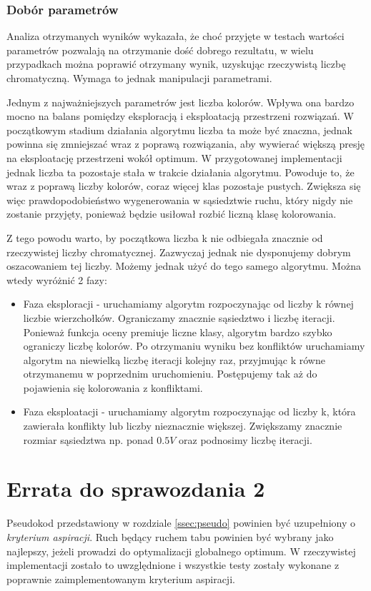 \documentclass[12pt,a4paper]{article}
\begin{document}
\subsubsection{Dobór parametrów}
Analiza otrzymanych wyników wykazała, że choć przyjęte w testach wartości parametrów pozwalają na otrzymanie dość dobrego rezultatu, w wielu przypadkach można poprawić otrzymany wynik, uzyskując rzeczywistą liczbę chromatyczną. Wymaga to jednak manipulacji parametrami.

Jednym z najważniejszych parametrów jest liczba kolorów. Wpływa ona bardzo mocno na balans pomiędzy eksploracją i eksploatacją przestrzeni rozwiązań. W początkowym stadium działania algorytmu liczba ta może być znaczna, jednak powinna się zmniejszać wraz z poprawą rozwiązania, aby wywierać większą presję na eksploatację przestrzeni wokół optimum. W przygotowanej implementacji jednak liczba ta pozostaje stała w trakcie działania algorytmu. Powoduje to, że wraz z poprawą liczby kolorów, coraz więcej klas pozostaje pustych. Zwiększa się więc prawdopodobieństwo wygenerowania w sąsiedztwie ruchu, który nigdy nie zostanie przyjęty, ponieważ będzie usiłował rozbić liczną klasę kolorowania.

Z tego powodu warto, by początkowa liczba k nie odbiegała znacznie od rzeczywistej liczby chromatycznej. Zazwyczaj jednak nie dysponujemy dobrym oszacowaniem tej liczby. Możemy jednak użyć do tego samego algorytmu. Można wtedy wyróżnić 2 fazy: 
\begin{itemize}
\item Faza eksploracji - uruchamiamy algorytm rozpoczynając od liczby k równej liczbie wierzchołków. Ograniczamy znacznie sąsiedztwo i liczbę iteracji. Ponieważ funkcja oceny premiuje liczne klasy, algorytm bardzo szybko ograniczy liczbę kolorów. Po otrzymaniu wyniku bez konfliktów uruchamiamy algorytm na niewielką liczbę iteracji kolejny raz, przyjmując k równe otrzymanemu w poprzednim uruchomieniu. Postępujemy tak aż do pojawienia się kolorowania z konfliktami.
\item Faza eksploatacji - uruchamiamy algorytm rozpoczynając od liczby k, która zawierała konflikty lub liczby nieznacznie większej. Zwiększamy znacznie rozmiar sąsiedztwa np. ponad $0.5 V$ oraz podnosimy liczbę iteracji.

\end{itemize}

\section{Errata do sprawozdania 2}
Pseudokod przedstawiony w rozdziale \ref{ssec:pseudo} powinien być uzupełniony o \textit{kryterium aspiracji}. Ruch będący ruchem tabu powinien być wybrany jako najlepszy, jeżeli prowadzi do optymalizacji globalnego optimum. W rzeczywistej implementacji zostało to uwzględnione i wszystkie testy zostały wykonane z poprawnie zaimplementowanym kryterium aspiracji.
\end{document}

